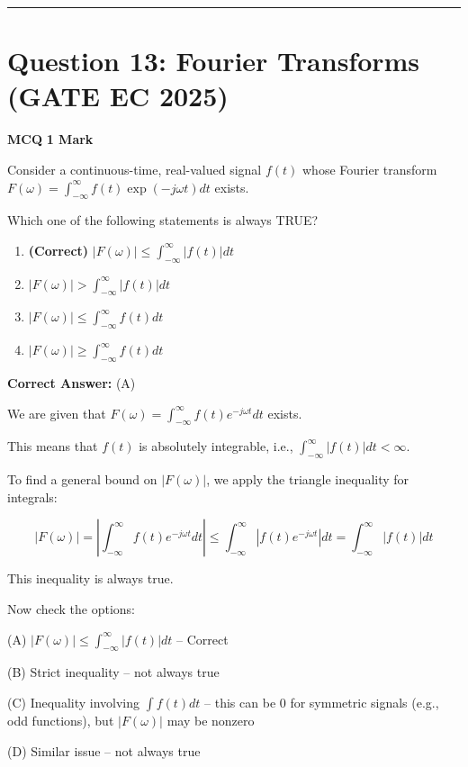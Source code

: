 \documentclass[11pt,a4paper]{article}
\begin{document}
\vspace{1.5em}
\hrule
\vspace{1.5em}

\section*{Question 13: Fourier Transforms (GATE EC 2025)}
\noindent \textbf{\color{primary}MCQ} \hfill \textbf{\color{secondary}1 Mark}


\noindent Consider a continuous-time, real-valued signal $f(t)$ whose Fourier transform $F(\omega)=\int_{-\infty}^{\infty} f(t) \exp (-j \omega t) d t$ exists.

Which one of the following statements is always TRUE?


\begin{enumerate}[label=(\Alph*)]
    \item \textbf{(Correct)} $|F(\omega)| \leq \int_{-\infty}^{\infty}|f(t)| d t$
    \item $|F(\omega)|>\int_{-\infty}^{\infty}|f(t)| d t$
    \item $|F(\omega)| \leq \int_{-\infty}^{\infty} f(t) d t$
    \item $|F(\omega)| \geq \int_{-\infty}^{\infty} f(t) d t$
\end{enumerate}

\noindent \textbf{Correct Answer:} (A)

\begin{tcolorbox}[solbox, title=Detailed Solution -- Question 13]
We are given that $F(\omega) = \int_{-\infty}^{\infty} f(t) e^{-j\omega t} dt$ exists. 

This means that $f(t)$ is absolutely integrable, i.e., $\int_{-\infty}^{\infty} |f(t)| dt < \infty$. 

To find a general bound on $|F(\omega)|$, we apply the triangle inequality for integrals: 

\[
|F(\omega)| = \left| \int_{-\infty}^{\infty} f(t) e^{-j\omega t} dt \right| \le \int_{-\infty}^{\infty} |f(t) e^{-j\omega t}| dt = \int_{-\infty}^{\infty} |f(t)| dt
\]
 

This inequality is always true. 

Now check the options: 

(A) $|F(\omega)| \le \int_{-\infty}^{\infty} |f(t)| dt$ -- Correct 

(B) Strict inequality -- not always true 

(C) Inequality involving $\int f(t) dt$ -- this can be 0 for symmetric signals (e.g., odd functions), but $|F(\omega)|$ may be nonzero 

(D) Similar issue -- not always true
\end{tcolorbox}
\end{document}
